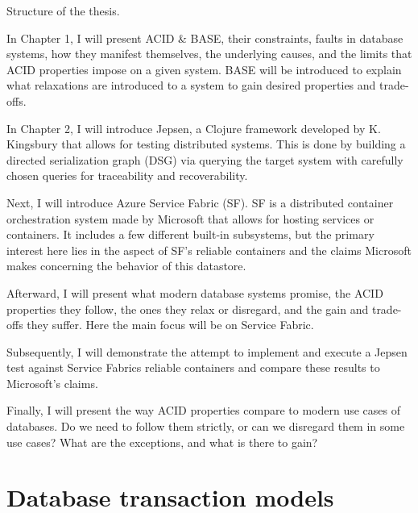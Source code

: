 \documentclass[a4paper,10pt,titlepage]{report}
\begin{document}
Structure of the thesis.

    In Chapter 1, I will present ACID \& BASE, their constraints, faults in database systems, how they manifest themselves, the underlying causes, and the limits that ACID properties impose on a given system. BASE will be introduced to explain what relaxations are introduced to a system to gain desired properties and trade-offs.\\
    \vspace{5mm}

    In Chapter 2, I will introduce Jepsen, a Clojure framework\cite{jepsonio} developed by K. Kingsbury that allows for testing distributed systems. This is done by building a directed serialization graph (DSG) via querying the target system with carefully chosen queries for traceability and recoverability.  \\
    \vspace{5mm}

    Next, I will introduce Azure Service Fabric (SF). SF is a distributed container orchestration system made by Microsoft that allows for hosting services or containers. It includes a few different built-in subsystems, but the primary interest here lies in the aspect of SF's reliable containers and the claims Microsoft makes concerning the behavior of this datastore.\\
    \vspace{5mm}

    Afterward, I will present what modern database systems promise, the ACID properties they follow, the ones they relax or disregard, and the gain and trade-offs they suffer. Here the main focus will be on Service Fabric.\\
    \vspace{5mm}

    Subsequently,  I will demonstrate the attempt to implement and execute a Jepsen test against Service Fabrics reliable containers and compare these results to Microsoft's claims.\\
    \vspace{5mm}

    Finally, I will present the way ACID properties compare to modern use cases of databases. Do we need to follow them strictly, or can we disregard them in some use cases? What are the exceptions, and what is there to gain?\\


    \chapter{Database transaction models}
\end{document}
